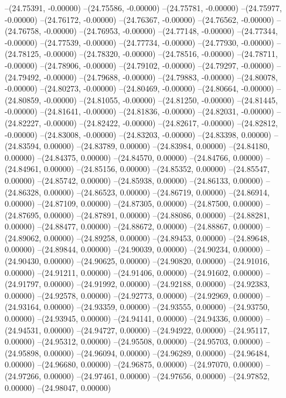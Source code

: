 --(24.75391, -0.00000)
--(24.75586, -0.00000)
--(24.75781, -0.00000)
--(24.75977, -0.00000)
--(24.76172, -0.00000)
--(24.76367, -0.00000)
--(24.76562, -0.00000)
--(24.76758, -0.00000)
--(24.76953, -0.00000)
--(24.77148, -0.00000)
--(24.77344, -0.00000)
--(24.77539, -0.00000)
--(24.77734, -0.00000)
--(24.77930, -0.00000)
--(24.78125, -0.00000)
--(24.78320, -0.00000)
--(24.78516, -0.00000)
--(24.78711, -0.00000)
--(24.78906, -0.00000)
--(24.79102, -0.00000)
--(24.79297, -0.00000)
--(24.79492, -0.00000)
--(24.79688, -0.00000)
--(24.79883, -0.00000)
--(24.80078, -0.00000)
--(24.80273, -0.00000)
--(24.80469, -0.00000)
--(24.80664, -0.00000)
--(24.80859, -0.00000)
--(24.81055, -0.00000)
--(24.81250, -0.00000)
--(24.81445, -0.00000)
--(24.81641, -0.00000)
--(24.81836, -0.00000)
--(24.82031, -0.00000)
--(24.82227, -0.00000)
--(24.82422, -0.00000)
--(24.82617, -0.00000)
--(24.82812, -0.00000)
--(24.83008, -0.00000)
--(24.83203, -0.00000)
--(24.83398, 0.00000)
--(24.83594, 0.00000)
--(24.83789, 0.00000)
--(24.83984, 0.00000)
--(24.84180, 0.00000)
--(24.84375, 0.00000)
--(24.84570, 0.00000)
--(24.84766, 0.00000)
--(24.84961, 0.00000)
--(24.85156, 0.00000)
--(24.85352, 0.00000)
--(24.85547, 0.00000)
--(24.85742, 0.00000)
--(24.85938, 0.00000)
--(24.86133, 0.00000)
--(24.86328, 0.00000)
--(24.86523, 0.00000)
--(24.86719, 0.00000)
--(24.86914, 0.00000)
--(24.87109, 0.00000)
--(24.87305, 0.00000)
--(24.87500, 0.00000)
--(24.87695, 0.00000)
--(24.87891, 0.00000)
--(24.88086, 0.00000)
--(24.88281, 0.00000)
--(24.88477, 0.00000)
--(24.88672, 0.00000)
--(24.88867, 0.00000)
--(24.89062, 0.00000)
--(24.89258, 0.00000)
--(24.89453, 0.00000)
--(24.89648, 0.00000)
--(24.89844, 0.00000)
--(24.90039, 0.00000)
--(24.90234, 0.00000)
--(24.90430, 0.00000)
--(24.90625, 0.00000)
--(24.90820, 0.00000)
--(24.91016, 0.00000)
--(24.91211, 0.00000)
--(24.91406, 0.00000)
--(24.91602, 0.00000)
--(24.91797, 0.00000)
--(24.91992, 0.00000)
--(24.92188, 0.00000)
--(24.92383, 0.00000)
--(24.92578, 0.00000)
--(24.92773, 0.00000)
--(24.92969, 0.00000)
--(24.93164, 0.00000)
--(24.93359, 0.00000)
--(24.93555, 0.00000)
--(24.93750, 0.00000)
--(24.93945, 0.00000)
--(24.94141, 0.00000)
--(24.94336, 0.00000)
--(24.94531, 0.00000)
--(24.94727, 0.00000)
--(24.94922, 0.00000)
--(24.95117, 0.00000)
--(24.95312, 0.00000)
--(24.95508, 0.00000)
--(24.95703, 0.00000)
--(24.95898, 0.00000)
--(24.96094, 0.00000)
--(24.96289, 0.00000)
--(24.96484, 0.00000)
--(24.96680, 0.00000)
--(24.96875, 0.00000)
--(24.97070, 0.00000)
--(24.97266, 0.00000)
--(24.97461, 0.00000)
--(24.97656, 0.00000)
--(24.97852, 0.00000)
--(24.98047, 0.00000)
